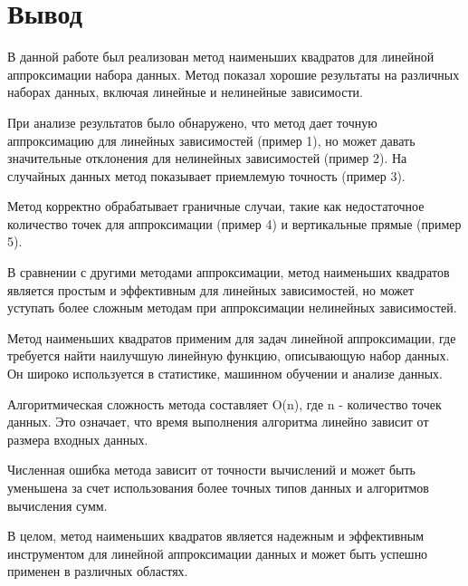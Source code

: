 \section{Вывод}

В данной работе был реализован метод наименьших квадратов для линейной аппроксимации набора данных. Метод показал хорошие результаты на различных наборах данных, включая линейные и нелинейные зависимости.

При анализе результатов было обнаружено, что метод дает точную аппроксимацию для линейных зависимостей (пример 1), но может давать значительные отклонения для нелинейных зависимостей (пример 2). На случайных данных метод показывает приемлемую точность (пример 3).

Метод корректно обрабатывает граничные случаи, такие как недостаточное количество точек для аппроксимации (пример 4) и вертикальные прямые (пример 5).

В сравнении с другими методами аппроксимации, метод наименьших квадратов является простым и эффективным для линейных зависимостей, но может уступать более сложным методам при аппроксимации нелинейных зависимостей.

Метод наименьших квадратов применим для задач линейной аппроксимации, где требуется найти наилучшую линейную функцию, описывающую набор данных. Он широко используется в статистике, машинном обучении и анализе данных.

Алгоритмическая сложность метода составляет O(n), где n - количество точек данных. Это означает, что время выполнения алгоритма линейно зависит от размера входных данных.

Численная ошибка метода зависит от точности вычислений и может быть уменьшена за счет использования более точных типов данных и алгоритмов вычисления сумм.

В целом, метод наименьших квадратов является надежным и эффективным инструментом для линейной аппроксимации данных и может быть успешно применен в различных областях.
